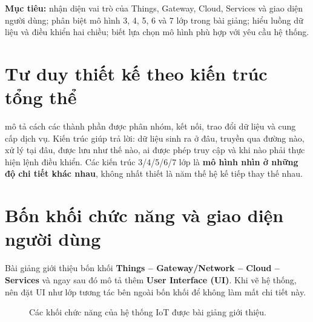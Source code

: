 \begin{notebox}
\textbf{Mục tiêu:} nhận diện vai trò của Things, Gateway, Cloud, Services và giao diện người dùng; phân biệt mô hình 3, 4, 5, 6 và 7 lớp trong bài giảng; hiểu luồng dữ liệu và điều khiển hai chiều; biết lựa chọn mô hình phù hợp với yêu cầu hệ thống.
\end{notebox}
\section{Tư duy thiết kế theo kiến trúc tổng thể}
 mô tả cách các thành phần được phân nhóm, kết nối, trao đổi dữ liệu và cung cấp dịch vụ. Kiến trúc giúp trả lời: dữ liệu sinh ra ở đâu, truyền qua đường nào, xử lý tại đâu, được lưu như thế nào, ai được phép truy cập và khi nào phải thực hiện lệnh điều khiển. Các kiến trúc 3/4/5/6/7 lớp là \textbf{mô hình nhìn ở những độ chi tiết khác nhau}, không nhất thiết là năm thế hệ kế tiếp thay thế nhau.

\section{Bốn khối chức năng và giao diện người dùng}
Bài giảng giới thiệu bốn khối \textbf{Things -- Gateway/Network -- Cloud -- Services} và ngay sau đó mô tả thêm \textbf{User Interface (UI)}. Khi vẽ hệ thống, nên đặt UI như lớp tương tác bên ngoài bốn khối để không làm mất chi tiết này.

\begin{figure}[H]\centering
{}\caption{Các khối chức năng của hệ thống IoT được bài giảng giới thiệu.}
\end{figure}

